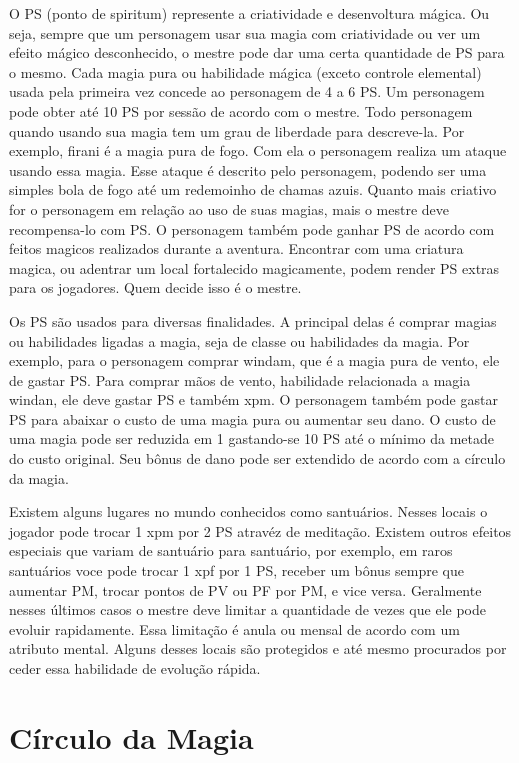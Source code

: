O PS (ponto de spiritum) represente a criatividade e desenvoltura mágica. Ou seja, sempre que um personagem usar sua magia com criatividade ou ver um efeito mágico desconhecido, o mestre pode dar uma certa quantidade de PS para o mesmo. Cada magia pura ou habilidade mágica (exceto controle elemental) usada pela primeira vez concede ao personagem de 4 a 6 PS. Um personagem pode obter até 10 PS por sessão de acordo com o mestre. Todo personagem quando usando sua magia tem um grau de liberdade para descreve-la. Por exemplo, firani é a magia pura de fogo. Com ela o personagem realiza um ataque usando essa magia. Esse ataque é descrito pelo personagem, podendo ser uma simples bola de fogo até um redemoinho de chamas azuis. Quanto mais criativo for o personagem em relação ao uso de suas magias, mais o mestre deve recompensa-lo com PS. O personagem também pode ganhar PS de acordo com feitos magicos realizados durante a aventura. Encontrar com uma criatura magica, ou adentrar um local fortalecido magicamente, podem render PS extras para os jogadores. Quem decide isso é o mestre. 


Os PS são usados para diversas finalidades. A principal delas é comprar magias ou habilidades ligadas a magia, seja de classe ou habilidades da magia. Por exemplo, para o personagem comprar windam, que é a magia pura de vento, ele de gastar PS. Para comprar mãos de vento, habilidade relacionada a magia windan, ele deve gastar PS e também xpm. O personagem também pode gastar PS para abaixar o custo de uma magia pura ou aumentar seu dano. O custo de uma magia pode ser reduzida em 1 gastando-se 10 PS até o mínimo da metade do custo original. Seu bônus de dano pode ser extendido de acordo com a círculo da magia.

Existem alguns lugares no mundo conhecidos como santuários. Nesses locais o jogador pode trocar 1 xpm por 2 PS atravéz de meditação. Existem outros efeitos especiais que variam de santuário para santuário, por exemplo, em raros santuários voce pode trocar 1 xpf por 1 PS, receber um bônus sempre que aumentar PM, trocar pontos de PV ou PF por PM, e vice versa. Geralmente nesses últimos casos o mestre deve limitar a quantidade de vezes que ele pode evoluir rapidamente. Essa limitação é anula ou mensal de acordo com um atributo mental. Alguns desses locais são protegidos e até mesmo procurados por ceder essa habilidade de evolução rápida.

\section{Círculo da Magia}

